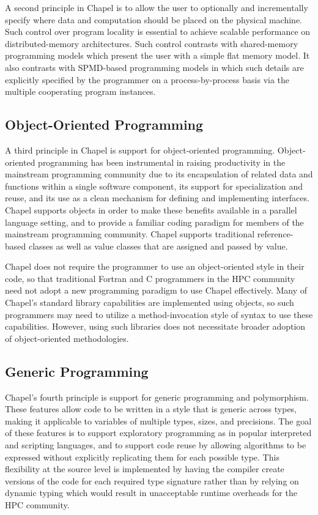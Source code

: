 A second principle in Chapel is to allow the user to optionally and
incrementally specify where data and computation should be placed on
the physical machine.  Such control over program locality is essential
to achieve scalable performance on distributed-memory architectures.  Such control
contrasts with shared-memory programming models which present the user
with a simple flat memory model.  It also contrasts with SPMD-based
programming models in which such details are explicitly specified by
the programmer on a process-by-process basis via the multiple
cooperating program instances.

\subsection{Object-Oriented Programming}

A third principle in Chapel is support for object-oriented
programming.  Object-oriented programming has been instrumental in
raising productivity in the mainstream programming community due to
its encapsulation of related data and functions within a single software
component, its support for specialization and reuse, and its use as a
clean mechanism for defining and implementing interfaces.  Chapel
supports objects in order to make these benefits available in a
parallel language setting, and to provide a familiar coding paradigm for
members of the mainstream programming community.  Chapel supports
traditional reference-based classes as well as value classes that are
assigned and passed by value.

Chapel does not require the programmer to use an object-oriented style
in their code, so that traditional Fortran and C programmers in the
HPC community need not adopt a new programming paradigm to
use Chapel effectively.  Many of Chapel's standard library
capabilities are implemented using objects, so such programmers may
need to utilize a method-invocation style of syntax to use these
capabilities.  However, using such libraries does not necessitate
broader adoption of object-oriented methodologies.

\subsection{Generic Programming}

Chapel's fourth principle is support for generic programming and
polymorphism.  These features allow code to be written in a style that
is generic across types, making it applicable to variables of multiple
types, sizes, and precisions.  The goal of these features is to
support exploratory programming as in popular interpreted and
scripting languages, and to support code reuse by allowing algorithms
to be expressed without explicitly replicating them for each possible
type.  This flexibility at the source level is implemented by having
the compiler create versions of the code for each required type
signature rather than by relying on dynamic typing which would result
in unacceptable runtime overheads for the HPC community.

